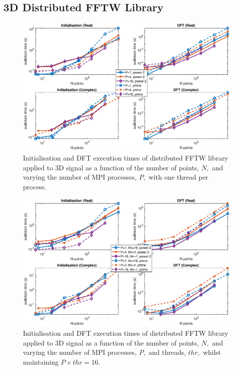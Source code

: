 \documentclass[a4paper]{article}
\begin{document}
\subsection{3D Distributed FFTW Library}\label{Sec:3DDistFFTW}

\begin{figure}[htb]
    \centering
    \includegraphics[width=0.9\linewidth]{../results/fftw_3d_mpi.eps}
  \caption{Initialisation and DFT execution times of distributed FFTW library applied to 3D signal as a function of the
    number of points, $N,$ and varying the number of MPI processes, $P,$ with one thread per process.}
  \label{3DDistFFTW}
\end{figure}

\begin{figure}[htb]
    \centering
    \includegraphics[width=0.9\linewidth]{../results/fftw_3d_mpi_thr.eps}
  \caption{Initialisation and DFT execution times of distributed FFTW library applied to 3D signal as a function of the
    number of points, $N,$ and varying the number of MPI processes, $P,$ and threads, $thr,$ whilst maintaining $P\times thr=16.$}
  \label{3DDistFFTW16}
\end{figure}
\end{document}
